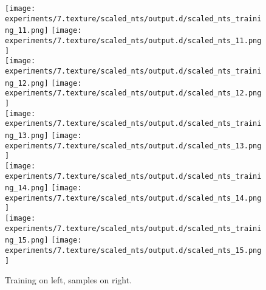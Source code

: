 \begin{figure}
\texttt{[image: experiments/7.texture/scaled\_nts/output.d/scaled\_nts\_training\_11.png]}
\hfill
\texttt{[image: experiments/7.texture/scaled\_nts/output.d/scaled\_nts\_11.png]}
\\\vspace{3\baselineskip}
\texttt{[image: experiments/7.texture/scaled\_nts/output.d/scaled\_nts\_training\_12.png]}
\hfill
\texttt{[image: experiments/7.texture/scaled\_nts/output.d/scaled\_nts\_12.png]}
\\\vspace{3\baselineskip}
\texttt{[image: experiments/7.texture/scaled\_nts/output.d/scaled\_nts\_training\_13.png]}
\hfill
\texttt{[image: experiments/7.texture/scaled\_nts/output.d/scaled\_nts\_13.png]}
\\\vspace{3\baselineskip}
\texttt{[image: experiments/7.texture/scaled\_nts/output.d/scaled\_nts\_training\_14.png]}
\hfill
\texttt{[image: experiments/7.texture/scaled\_nts/output.d/scaled\_nts\_14.png]}
\\\vspace{3\baselineskip}
\texttt{[image: experiments/7.texture/scaled\_nts/output.d/scaled\_nts\_training\_15.png]}
\hfill
\texttt{[image: experiments/7.texture/scaled\_nts/output.d/scaled\_nts\_15.png]}
\caption{Training on left, samples on right.}
\end{figure}
